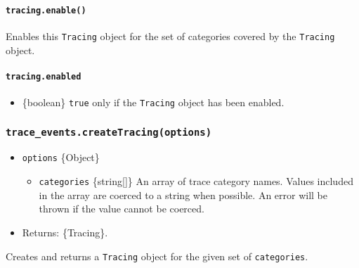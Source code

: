 \paragraph{\texorpdfstring{\texttt{tracing.enable()}}{tracing.enable()}}\label{tracing.enable}

Enables this \texttt{Tracing} object for the set of categories covered
by the \texttt{Tracing} object.

\paragraph{\texorpdfstring{\texttt{tracing.enabled}}{tracing.enabled}}\label{tracing.enabled}

\begin{itemize}
\tightlist
\item
  \{boolean\} \texttt{true} only if the \texttt{Tracing} object has been
  enabled.
\end{itemize}

\subsubsection{\texorpdfstring{\texttt{trace\_events.createTracing(options)}}{trace\_events.createTracing(options)}}\label{trace_events.createtracingoptions}

\begin{itemize}
\tightlist
\item
  \texttt{options} \{Object\}

  \begin{itemize}
  \tightlist
  \item
    \texttt{categories} \{string{[}{]}\} An array of trace category
    names. Values included in the array are coerced to a string when
    possible. An error will be thrown if the value cannot be coerced.
  \end{itemize}
\item
  Returns: \{Tracing\}.
\end{itemize}

Creates and returns a \texttt{Tracing} object for the given set of
\texttt{categories}.

\begin{Shaded}
\begin{Highlighting}[]
\OperatorTok{=} \NormalTok{(}\NormalTok{)}\OperatorTok{;}
\OperatorTok{=}\NormalTok{ [}\OperatorTok{,} \NormalTok{]}\OperatorTok{;}
\OperatorTok{=}\OperatorTok{;}
\NormalTok{()}\OperatorTok{;}
\NormalTok{()}\OperatorTok{;}
\end{Highlighting}
\end{Shaded}

